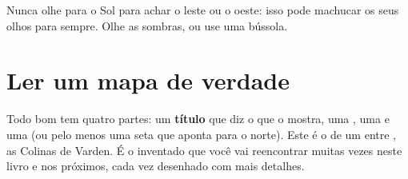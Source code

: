 \begin{safety}
Nunca olhe para o Sol para achar o leste ou o oeste: isso pode machucar os
seus olhos para sempre. Olhe as sombras, ou use uma bússola.
\end{safety}

\section{Ler um mapa de verdade}

Todo bom  tem quatro partes: um \textbf{título} que diz o que o 
mostra, uma \textbf{}, uma \textbf{} e uma \textbf{} (ou pelo menos uma seta que aponta para o norte). Este é o  de
um  entre , as Colinas de Varden. É o  inventado que você vai
reencontrar muitas vezes neste livro e nos próximos, cada vez desenhado
com mais detalhes.

